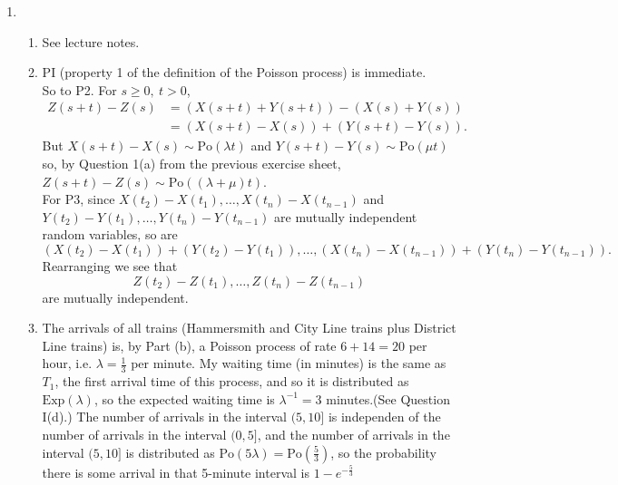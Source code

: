 \documentclass[11pt,a4paper]{article}
\begin{document}
\begin{enumerate}
        \item 
        \begin{enumerate}
            \item See lecture notes.
            \item PI (property 1 of the definition of the Poisson process) is immediate.\\
            So to P2. For $s \geq 0,\ t>0$,
            \begin{align*}
                Z(s+t)-Z(s)
                &= (X(s+t)+Y(s+t))-(X(s)+Y(s))\\
                &= (X(s+t)-X(s))+(Y(s+t)-Y(s)).
            \end{align*}
            But $X(s+t)-X(s)\sim \text{Po}(\lambda t)$ and $Y(s+t)-Y(s)\sim \text{Po}(\mu t)$ so, by Question 1(a) from the previous exercise sheet, $Z(s+t)-Z(s)\sim \text{Po}((\lambda+\mu)t)$.\\
            For P3, since $X(t_2)-X(t_1),\ldots,X(t_n)-X(t_{n-1})$ and $Y(t_2)-Y(t_1),\ldots,Y(t_n)-Y(t_{n-1})$ are mutually independent random variables, so are 
            $$(X(t_2)-X(t_1))+(Y(t_2)-Y(t_1)),\ldots,(X(t_n)-X(t_{n-1}))+(Y(t_n)-Y(t_{n-1})).$$
            Rearranging we see that
            $$Z(t_2)-Z(t_1),\ldots,Z(t_n)-Z(t_{n-1})$$
            are mutually independent.
            \item The arrivals of all trains (Hammersmith and City Line trains plus District Line trains) is, by Part (b), a Poisson process of rate $6 + 14 = 20$ per hour, i.e. $\lambda = \tfrac{1}{3}$ per minute. My waiting time (in minutes) is the same as $T_1$, the first arrival time of this process, and so it is distributed as $\text{Exp}(\lambda)$, so the expected waiting time is $\lambda^{-1}=3$ minutes.(See Question I(d).) The number of arrivals in the interval $(5, 10]$ is independen of the number of arrivals in the interval $(0, 5]$, and the number of arrivals in the interval $(5, 10]$ is distributed as $\text{Po}(5\lambda)=\text{Po}(\tfrac{5}{3})$, so the probability there is some arrival in that 5-minute interval is $1-e^{-\tfrac{5}{3}}$
        \end{enumerate}

    \end{enumerate}
\end{document}
